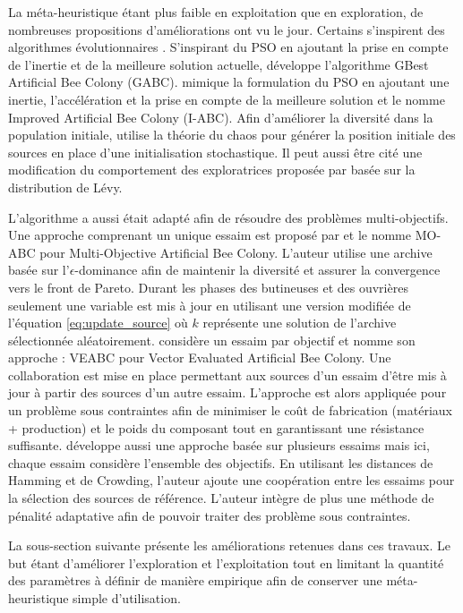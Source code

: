 La méta-heuristique étant plus faible en exploitation que en exploration, de nombreuses
propositions d’améliorations ont vu le jour. Certains s’inspirent des algorithmes
évolutionnaires \parencite{Bi2011174,Zhao2010558}. S’inspirant du PSO en ajoutant
la prise en compte de l’inertie et de la meilleure solution actuelle, \cite{Zhu20103166}
développe l’algorithme GBest Artificial Bee Colony (GABC).
\cite{Li2012320} mimique la formulation du PSO en ajoutant une inertie, l’accélération et la prise
en compte de la meilleure solution et le nomme Improved Artificial Bee Colony (I-ABC).
Afin d’améliorer la diversité dans la population initiale, \cite{Xiang20131256}
utilise la théorie du chaos pour générer la position initiale des sources en place
d’une initialisation stochastique. Il peut aussi être cité une modification du comportement
des exploratrices proposée par \cite{Sharma2012213} basée sur la distribution de
Lévy.

L’algorithme a aussi était adapté afin de résoudre des problèmes multi-objectifs.
Une approche comprenant un unique essaim est proposé par \cite{Akbari201239}
et le nomme MO-ABC pour Multi-Objective Artificial Bee Colony.
L’auteur utilise une archive basée sur l’$\epsilon$-dominance afin de maintenir
la diversité et assurer la convergence vers le front de Pareto. Durant les phases
des butineuses et des ouvrières seulement une variable est mis à jour en utilisant
une version modifiée de l’équation \eqref{eq:update_source} où $k$ représente une
solution de l’archive sélectionnée aléatoirement.
\cite{Omkar2011489} considère un essaim par objectif et nomme son approche : VEABC
pour Vector Evaluated Artificial Bee Colony.
Une collaboration est mise en place permettant aux sources d’un essaim d’être mis
à jour à partir des sources d’un autre essaim. L’approche est alors appliquée pour un
problème sous contraintes afin de minimiser le coût de fabrication (matériaux + production)
et le poids du composant tout en garantissant une résistance suffisante.
\cite{Zhang20121} développe aussi une approche basée sur plusieurs essaims mais ici,
chaque essaim considère l’ensemble des objectifs. En utilisant les distances de Hamming
et de Crowding, l’auteur ajoute une coopération entre les essaims pour la sélection
des sources de référence. L’auteur intègre de plus une méthode de pénalité adaptative
\parencite{Woldesenbet20073077} afin de pouvoir traiter des problème sous contraintes.

La sous-section suivante présente les améliorations retenues dans ces travaux.
Le but étant d’améliorer l’exploration et l’exploitation tout en limitant la
quantité des paramètres à définir de manière empirique afin de conserver une
méta-heuristique simple d’utilisation.



